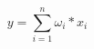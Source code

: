 \documentclass[a4paper]{article}
\begin{document}
\begin{equation}
   y=\sum_{i=1}^{n} \omega_i * x_i
\end{equation}
\end{document}

